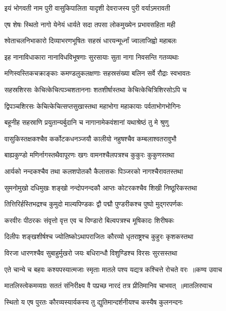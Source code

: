 \twolineshloka
{इयं भोगवती नाम पुरी वासुकिपालिता}
{यादृशी देवराजस्य पुरी वर्याऽमरावती}


\twolineshloka
{एष शेषः स्थितो नागो येनेयं धार्यते सदा}
{तपसा लोकमुख्येन प्रभावसहिता मही}


\twolineshloka
{श्वेताचलनिभाकारो दिव्याभरणभूषितः}
{सहस्रं धारयन्मूर्ध्नां ज्वालाजिह्वो महाबलः}


\twolineshloka
{इह नानाविधाकारा नानाविधविभूषणाः}
{सुरसायाः सुता नागा निवसन्ति गतव्यथाः}


\twolineshloka
{मणिस्वस्तिकचक्राङ्काः कमण्डलुकलक्षणाः}
{सहस्रसंख्या बलिन सर्वे रौद्राः स्वभावतः}


\twolineshloka
{सहस्रशिरसः केचित्केचित्पञ्चशताननाः}
{शतशीर्षास्तथा केचित्केचित्रिशिरसोऽपि च}


\twolineshloka
{द्विपञ्चशिरसः केचित्केचित्सप्तसुखास्तथा}
{महाभोगा महाकायाः पर्वताभोगभोगिनः}


\twolineshloka
{बहूनीह सहस्राणि प्रयुतान्यर्बुदानि च}
{नागानामेकवंशानां यथाश्रेष्ठं तु मे श्रुणु}


\twolineshloka
{वासुकिस्तक्षकश्चैव कर्कोटकधनञ्जयौ}
{कालीयो नहुषश्चैव कम्बलाश्वतरावुभौ}


\twolineshloka
{बाह्यकुण्डो मणिर्नागस्तथैवापूरणः खगः}
{वामनश्चैलपत्रश्च कुकुरः कुकुणस्तथा}


\twolineshloka
{आर्यको नन्दकश्चैव तथा कलशपोतकौ}
{कैलासकः पिञ्जरको नागश्चैरावतस्तथा}


\twolineshloka
{सुमनोमुखो दधिमुखः शङ्खो नन्दोपनन्दकौ}
{आप्तः कोटरकश्चैव शिखी निष्ठूरिकस्तथा}


\twolineshloka
{तित्तिरिर्हस्तिभद्रश्च कुमुदो माल्यपिण्डकः}
{द्वौ पद्मौ पुण्डरीकश्च पुष्पो मुद्गरपर्णकः}


\twolineshloka
{करवीरः पीठरकः संवृत्तो वृत्त एव च}
{पिण्डारो बिल्वपत्रश्च मूषिकादः शिरीषकः}


\twolineshloka
{दिलीपः शङ्खशीर्षश्च ज्योतिष्कोऽथापराजितः}
{कौरव्यो धृतराष्ट्रश्च कुहुरः कृशकस्तथा}


\twolineshloka
{विरजा धारणश्चैव सुबाहुर्मुखरो जयः}
{बधिरान्धौ विशुण्डिश्च विरसः सुरसस्तथा}


\threelineshloka
{एते चान्ये च बहवः कश्यपस्यात्मजाः स्मृताः}
{मातले पश्य यद्यत्र कश्चित्ते रोचते वरः ॥कण्व उवाच}
{}


\threelineshloka
{मातलिस्त्वेकमव्यग्रः सततं संनिरीक्ष्य वै}
{पप्रच्छ नारदं तत्र प्रीतिमानिव चाभवत् ॥मातलिरुवाच}
{}


\twolineshloka
{स्थितो य एष पुरतः कौरव्यस्यार्यकस्य तु}
{द्युतिमान्दर्शनीयश्च कस्यैष कुलनन्दनः}


